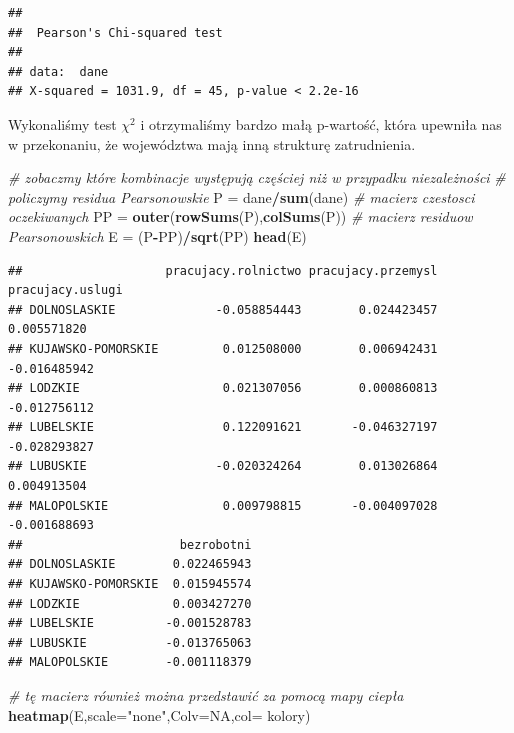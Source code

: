 \documentclass[polish,]{book}
\newenvironment{Shaded}{\begin{snugshade}}{\end{snugshade}}
\newcommand{\CommentTok}[1]{\textcolor[rgb]{0.56,0.35,0.01}{\textit{#1}}}
\newcommand{\DataTypeTok}[1]{\textcolor[rgb]{0.13,0.29,0.53}{#1}}
\newcommand{\KeywordTok}[1]{\textcolor[rgb]{0.13,0.29,0.53}{\textbf{#1}}}
\newcommand{\NormalTok}[1]{#1}
\newcommand{\OperatorTok}[1]{\textcolor[rgb]{0.81,0.36,0.00}{\textbf{#1}}}
\newcommand{\OtherTok}[1]{\textcolor[rgb]{0.56,0.35,0.01}{#1}}
\newcommand{\StringTok}[1]{\textcolor[rgb]{0.31,0.60,0.02}{#1}}
\begin{document}
\begin{verbatim}
## 
##  Pearson's Chi-squared test
## 
## data:  dane
## X-squared = 1031.9, df = 45, p-value < 2.2e-16
\end{verbatim}

Wykonaliśmy test \(\chi^2\) i otrzymaliśmy bardzo małą p-wartość, która upewniła nas w przekonaniu, że województwa mają inną strukturę zatrudnienia.

\begin{Shaded}
\begin{Highlighting}[]
\CommentTok{# zobaczmy które kombinacje występują częściej niż w przypadku niezależności}
\CommentTok{# policzymy residua Pearsonowskie}
\NormalTok{P =}\StringTok{ }\NormalTok{dane}\OperatorTok{/}\KeywordTok{sum}\NormalTok{(dane)}
\CommentTok{# macierz czestosci oczekiwanych}
\NormalTok{PP =}\StringTok{ }\KeywordTok{outer}\NormalTok{(}\KeywordTok{rowSums}\NormalTok{(P),}\KeywordTok{colSums}\NormalTok{(P))}
\CommentTok{# macierz residuow Pearsonowskich}
\NormalTok{E =}\StringTok{ }\NormalTok{(P}\OperatorTok{-}\NormalTok{PP)}\OperatorTok{/}\KeywordTok{sqrt}\NormalTok{(PP)}
\KeywordTok{head}\NormalTok{(E)}
\end{Highlighting}
\end{Shaded}

\begin{verbatim}
##                    pracujacy.rolnictwo pracujacy.przemysl pracujacy.uslugi
## DOLNOSLASKIE              -0.058854443        0.024423457      0.005571820
## KUJAWSKO-POMORSKIE         0.012508000        0.006942431     -0.016485942
## LODZKIE                    0.021307056        0.000860813     -0.012756112
## LUBELSKIE                  0.122091621       -0.046327197     -0.028293827
## LUBUSKIE                  -0.020324264        0.013026864      0.004913504
## MALOPOLSKIE                0.009798815       -0.004097028     -0.001688693
##                      bezrobotni
## DOLNOSLASKIE        0.022465943
## KUJAWSKO-POMORSKIE  0.015945574
## LODZKIE             0.003427270
## LUBELSKIE          -0.001528783
## LUBUSKIE           -0.013765063
## MALOPOLSKIE        -0.001118379
\end{verbatim}

\begin{Shaded}
\begin{Highlighting}[]
\CommentTok{# tę macierz również można przedstawić za pomocą mapy ciepła}
\KeywordTok{heatmap}\NormalTok{(E,}\DataTypeTok{scale=}\StringTok{"none"}\NormalTok{,}\DataTypeTok{Colv=}\OtherTok{NA}\NormalTok{,}\DataTypeTok{col=}\NormalTok{ kolory)}
\end{Highlighting}
\end{Shaded}
\end{document}
